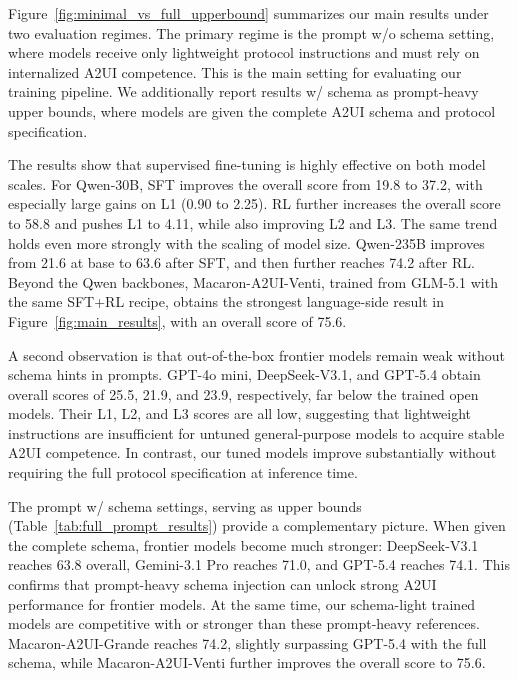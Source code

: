 \documentclass{llmxive}
\begin{document}
Figure~\ref{fig:minimal_vs_full_upperbound} summarizes our main results under two evaluation regimes. The primary regime is the prompt w/o schema setting, where models receive only lightweight protocol instructions and must rely on internalized A2UI competence. This is the main setting for evaluating our training pipeline. We additionally report results w/ schema as prompt-heavy upper bounds, where models are given the complete A2UI schema and protocol specification.

The results show that supervised fine-tuning is highly effective on both model scales. For Qwen-30B, SFT improves the overall score from 19.8 to 37.2, with especially large gains on L1 (0.90 to 2.25). RL further increases the overall score to 58.8 and pushes L1 to 4.11, while also improving L2 and L3. The same trend holds even more strongly with the scaling of model size. Qwen-235B improves from 21.6 at base to 63.6 after SFT, and then further reaches 74.2 after RL. Beyond the Qwen backbones, Macaron-A2UI-Venti, trained from GLM-5.1 with the same SFT+RL recipe, obtains the strongest language-side result in Figure~\ref{fig:main_results}, with an overall score of 75.6.

A second observation is that out-of-the-box frontier models remain weak without schema hints in prompts. GPT-4o mini, DeepSeek-V3.1, and GPT-5.4 obtain overall scores of 25.5, 21.9, and 23.9, respectively, far below the trained open models. Their L1, L2, and L3 scores are all low, suggesting that lightweight instructions are insufficient for untuned general-purpose models to acquire stable A2UI competence. In contrast, our tuned models improve substantially without requiring the full protocol specification at inference time.

The prompt w/ schema settings, serving as upper bounds (Table~\ref{tab:full_prompt_results}) provide a complementary picture. When given the complete schema, frontier models become much stronger: DeepSeek-V3.1 reaches 63.8 overall, Gemini-3.1 Pro reaches 71.0, and GPT-5.4 reaches 74.1. This confirms that prompt-heavy schema injection can unlock strong A2UI performance for frontier models. 
At the same time, our schema-light trained models are competitive with or stronger than these prompt-heavy references. Macaron-A2UI-Grande reaches 74.2, slightly surpassing GPT-5.4 with the full schema, while Macaron-A2UI-Venti further improves the overall score to 75.6.
\end{document}
